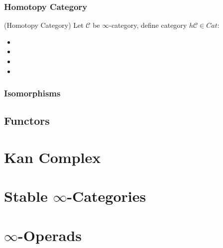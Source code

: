 \documentclass[Total.tex]{subfiles}
\begin{document}
			\subsection{Homotopy Category}
				\begin{Def}
					
				\end{Def}
				
				\begin{Def}
					(Homotopy Category) Let $\mathcal{C}$ be $\infty$-category, define category $h\mathcal{C}\in Cat$:
					\begin{itemize}
						\item 
						\item 
						\item 
						\item 
					\end{itemize}
				\end{Def}
			\subsection{Isomorphisms}
				\begin{Def}
					
				\end{Def}
		\section{Functors}
		
	\chapter{Kan Complex}
	\chapter{Stable $\infty$-Categories}
	
	\chapter{$\infty$-Operads}
\end{document}
